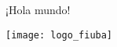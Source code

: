 \documentclass{article}
\begin{document}
¡Hola mundo!

\texttt{[image: logo\_fiuba]}
\end{document}
